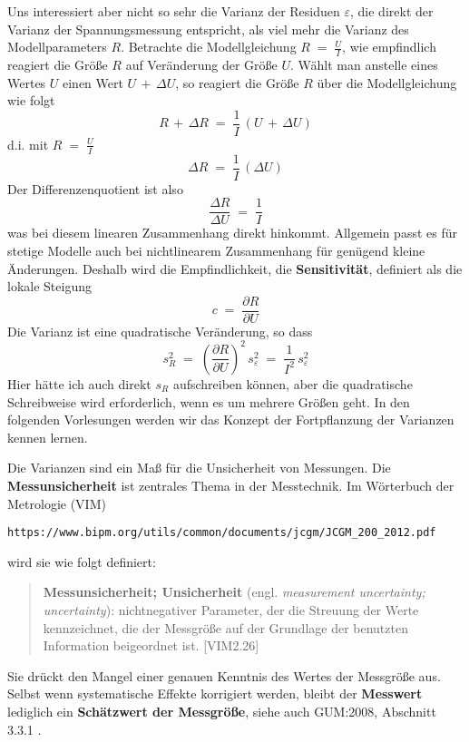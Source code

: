 Uns interessiert aber nicht so sehr die Varianz der Residuen $\varepsilon$, die direkt der Varianz
der Spannungsmessung entspricht,
als viel mehr die Varianz des Modellparameters $R$.
Betrachte die Modellgleichung $R \; = \; \frac{U}{I}$, wie empfindlich reagiert die Größe $R$ auf Veränderung der Größe $U$.
Wählt man anstelle eines Wertes $U$ einen Wert $U \, + \, \Delta U$, so reagiert die Größe $R$ über die Modellgleichung wie folgt
\begin{equation}
R \, + \, \Delta R \; = \; \frac{1}{I} \, \left( U \, + \, \Delta U \right)
\end{equation}
d.i. mit $R \; = \; \frac{U}{I}$
\begin{equation}
\Delta R \; = \; \frac{1}{I} \, \left( \Delta U \right)
\end{equation}
Der Differenzenquotient ist also
\begin{equation}
\frac{\Delta R}{\Delta U} \; = \; \frac{1}{I}
\end{equation}
was bei diesem linearen Zusammenhang direkt hinkommt. Allgemein passt es für stetige Modelle auch bei nichtlinearem Zusammenhang
für genügend kleine Änderungen. Deshalb wird die Empfindlichkeit, die \textbf{Sensitivität}, definiert als die lokale Steigung
\begin{equation}
c  \; = \; \frac{\partial R}{\partial U}
\end{equation}
Die Varianz ist eine quadratische Veränderung, so dass
\begin{equation}
s_R^2  \; = \; \left(\frac{\partial R}{\partial U}\right)^2 \, s_{\varepsilon}^2 \; = \; \frac{1}{I^2} \, s_{\varepsilon}^2
\end{equation}
Hier hätte ich auch direkt $s_R$ aufschreiben können, aber die quadratische Schreibweise wird erforderlich, wenn es um mehrere Größen geht. In den folgenden Vorlesungen werden wir das Konzept der Fortpflanzung der Varianzen kennen lernen.

Die Varianzen sind ein Maß für die Unsicherheit von Messungen. Die \textbf{Messunsicherheit} ist zentrales Thema in der Messtechnik.
Im Wörterbuch der Metrologie (VIM)
\begin{verbatim}
https://www.bipm.org/utils/common/documents/jcgm/JCGM_200_2012.pdf
\end{verbatim}
wird sie wie folgt definiert:
\begin{quote}
\textbf{Messunsicherheit; Unsicherheit} (engl. \textsl{measurement uncertainty; uncertainty}):
nichtnegativer Parameter, der die Streuung der Werte kennzeichnet, die der Messgröße
auf der Grundlage der benutzten Information beigeordnet ist. [VIM2.26]
\end{quote}
Sie drückt den Mangel einer genauen Kenntnis des Wertes der Messgröße aus.
Selbst wenn systematische Effekte korrigiert werden, bleibt der \textbf{Messwert} lediglich
ein \textbf{Schätz\-wert der Messgröße}, siehe auch GUM:2008, Abschnitt 3.3.1 .

